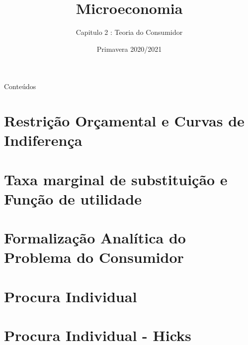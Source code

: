 \documentclass[table]{beamer}
\title{Microeconomia}
\subtitle{Capitulo 2 : Teoria do Consumidor}
\author[]{}
\institute[ISCAL]{\texttt{[image: ../visual material/logo\_eng\_full.png]}}
\date{Primavera 2020/2021}
\begin{document}
{
\begin{frame}
	\maketitle
\end{frame}
}

\begin{frame}{Conte\'udos}
  \tableofcontents
\end{frame}

\section{Restri\c c\~ao Or\c camental e Curvas de Indiferen\c ca}

\section{Taxa marginal de substitui\c c\~ao e Fun\c c\~ao de utilidade}

\section{Formaliza\c c\~ao Anal\'itica do Problema do Consumidor}

\section{Procura Individual}

\section{Procura Individual - Hicks}

\end{document}

